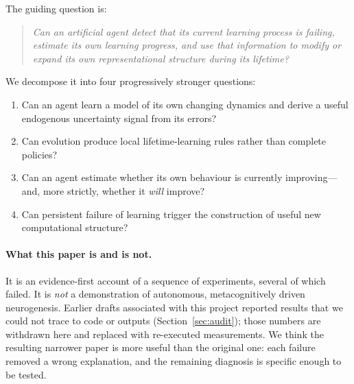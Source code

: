 \documentclass[11pt]{article}
\theoremstyle{remark}
\begin{document}
The guiding question is:
\begin{quote}
\emph{Can an artificial agent detect that its current learning process is failing, estimate its own learning
progress, and use that information to modify or expand its own representational structure during its
lifetime?}
\end{quote}
We decompose it into four progressively stronger questions:
\begin{enumerate}[label=\textbf{Q\arabic*}]
  \item Can an agent learn a model of its own changing dynamics and derive a useful endogenous uncertainty
        signal from its errors?
  \item Can evolution produce local lifetime-learning rules rather than complete policies?
  \item Can an agent estimate whether its own behaviour is currently improving---and, more strictly, whether it
        \emph{will} improve?
  \item Can persistent failure of learning trigger the construction of useful new computational structure?
\end{enumerate}

\paragraph{What this paper is and is not.}
It is an evidence-first account of a sequence of experiments, several of which failed. It is \emph{not} a
demonstration of autonomous, metacognitively driven neurogenesis. Earlier drafts associated with this project
reported results that we could not trace to code or outputs (Section~\ref{sec:audit}); those numbers are
withdrawn here and replaced with re-executed measurements. We think the resulting narrower paper is more
useful than the original one: each failure removed a wrong explanation, and the remaining diagnosis is
specific enough to be tested.
\end{document}
